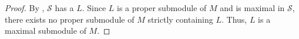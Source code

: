 \begin{proof}
    By , $\mathcal{S}$ has a  $L$. Since $L$ is a proper submodule of $M$ and is maximal in $\mathcal{S}$, there exists no proper submodule of $M$ strictly containing $L$. Thus, $L$ is a maximal submodule of $M$.
\end{proof}